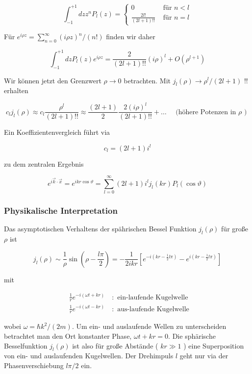 \documentclass[10pt, letterpaper]{article}
\begin{document}
$$
\int_{-1}^{+1} d z z^{n} P_{l}(z)=\left\{\begin{array}{cc}
0 & \text { für } n<l \\
\frac{2 l!}{(2 l+1)!!} & \text { für } n=l
\end{array}\right.
$$

Für $e^{i \rho z}=\sum_{n=0}^{\infty}(i \rho z)^{n} /(n!)$ finden wir daher

$$
\int_{-1}^{+1} d z P_{l}(z) e^{i \rho z}=\frac{2}{(2 l+1)!!}(i \rho)^{l}+O\left(\rho^{l+1}\right)
$$

Wir können jetzt den Grenzwert $\rho \rightarrow 0$ betrachten. Mit $j_{l}(\rho) \rightarrow \rho^{l} /(2 l+1)$ !! erhalten

$$
c_{l} j_{l}(\rho) \approx c_{l} \frac{\rho^{l}}{(2 l+1)!!} \approx \frac{(2 l+1)}{2} \frac{2(i \rho)^{l}}{(2 l+1)!!}+\ldots \quad \text { (höhere Potenzen in } \rho \text { ) }
$$

Ein Koeffizientenvergleich führt via

$$
c_{l}=(2 l+1) i^{l}
$$

zu dem zentralen Ergebnis

$$
e^{i \vec{k} \cdot \vec{x}}=e^{i k r \cos \vartheta}=\sum_{l=0}^{\infty}(2 l+1) i^{l} j_{l}(k r) P_{l}(\cos \vartheta)
$$

\subsubsection*{Physikalische Interpretation}
Das asymptotischen Verhaltens der spährischen Bessel Funktion $j_{l}(\rho)$ für große $\rho$ ist

$$
j_{l}(\rho) \sim \frac{1}{\rho} \sin \left(\rho-\frac{l \pi}{2}\right)=-\frac{1}{2 i k r}\left[e^{-i\left(k r-\frac{1}{2} l \pi\right)}-e^{i\left(k r-\frac{1}{2} l \pi\right)}\right]
$$

mit

$$
\begin{aligned}
& \frac{1}{r} e^{-i(\omega t+k r)} \quad: \text { ein-laufende Kugelwelle } \\
& \frac{1}{r} e^{-i(\omega t-k r)} \quad: \text { aus-laufende Kugelwelle }
\end{aligned}
$$

wobei $\omega=\hbar k^{2} /(2 m)$. Um ein- und auslaufende Wellen zu unterscheiden betrachtet man den Ort konstanter Phase, $\omega t+k r=0$. Die sphärische Besselfunktion $j_{l}(\rho)$ ist also für große Abstände ( $k r \gg 1$ ) eine Superposition von ein- und auslaufenden Kugelwellen. Der Drehimpuls $l$ geht nur via der Phasenverschiebung $l \pi / 2$ ein.
\end{document}
